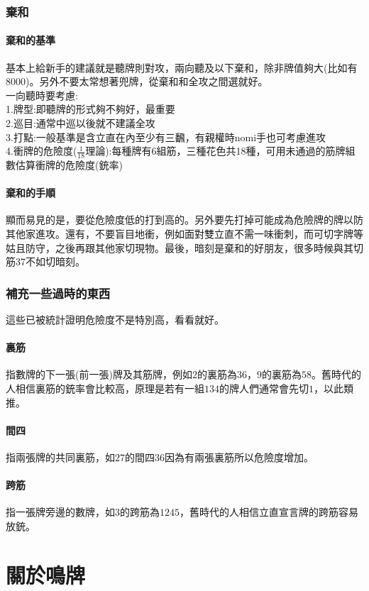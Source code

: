 \documentclass[a4paper,12pt]{article}
\begin{document}
\section{棄和}
\subsection{棄和的基準}
基本上給新手的建議就是聽牌則對攻，兩向聽及以下棄和，除非牌值夠大(比如有8000)。另外不要太常想著兜牌，從棄和和全攻之間選就好。 \\
一向聽時要考慮: \\
1.牌型:即聽牌的形式夠不夠好，最重要 \\
2.巡目:通常中巡以後就不建議全攻 \\
3.打點:一般基準是含立直在內至少有三飜，有親權時nomi手也可考慮進攻 \\
4.衝牌的危險度($\frac{1}{18}$理論):每種牌有6組筋，三種花色共18種，可用未通過的筋牌組數估算衝牌的危險度(銃率)
\subsection{棄和的手順}
顯而易見的是，要從危險度低的打到高的。另外要先打掉可能成為危險牌的牌以防其他家進攻。還有，不要盲目地衝，例如面對雙立直不需一味衝刺，而可切字牌等姑且防守，之後再跟其他家切現物。最後，暗刻是棄和的好朋友，很多時候與其切筋37不如切暗刻。
\section{補充一些過時的東西}
這些已被統計證明危險度不是特別高，看看就好。
\subsection{裏筋}
指數牌的下一張(前一張)牌及其筋牌，例如$2$的裏筋為$36$，$9$的裏筋為$58$。舊時代的人相信裏筋的銃率會比較高，原理是若有一組$134$的牌人們通常會先切$1$，以此類推。
\subsection{間四}
指兩張牌的共同裏筋，如$27$的間四$36$因為有兩張裏筋所以危險度增加。
\subsection{跨筋}
指一張牌旁邊的數牌，如$3$的跨筋為$1245$，舊時代的人相信立直宣言牌的跨筋容易放銃。
\part{關於鳴牌}
\end{document}
